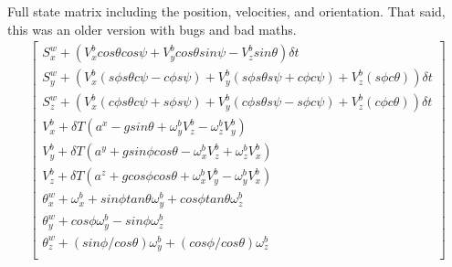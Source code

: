 \documentclass[conference]{IEEEtran}
\begin{document}
Full state matrix including the position, velocities, and orientation. That said, this was an older version with bugs and bad maths.
\begin{align}
\begin{bmatrix} 
S^w_x + (V^b_x cos \theta cos \psi + V^b_y cos \theta sin \psi - V^b_z sin \theta )  \delta t \\
S^w_y +  (V^b_x ( s \phi s\theta c\psi - c \phi s\psi) + V^b_y (s\phi s\theta s\psi + c\phi c\psi) + V^b_z (s \phi c \theta) )  \delta t \\
S^w_z +  (V^b_x (c \phi s \theta c \psi + s \phi s \psi) + V^b_y ( c \phi s \theta s\psi - s \phi c\psi) + V^b_z (c \phi c \theta) )  \delta t \\
V^b_x + \delta T (a^x - g sin \theta  + \omega_y^b V_z^b - \omega_z^b V_y^b ) \\
V^b_y + \delta T (a^y + g sin \phi cos \theta - \omega_x^b V_z^b + \omega_z^b V_x^b) \\
V^b_z + \delta T (a^z + g cos \phi cos \theta + \omega_x^b V_y^b - \omega_y^b V_x^b) \\
\theta_x^w + \omega_x^b + sin \phi tan \theta \omega_y^b + cos \phi tan \theta \omega_z^b\\
\theta_y^w + cos \phi \omega_y^b - sin \phi \omega_z^b\\
\theta_z^w + (sin \phi / cos \theta) \omega_y^b + (cos \phi / cos \theta) \omega_z^b\\ \end{bmatrix} \nonumber
\end{align}
\end{document}
